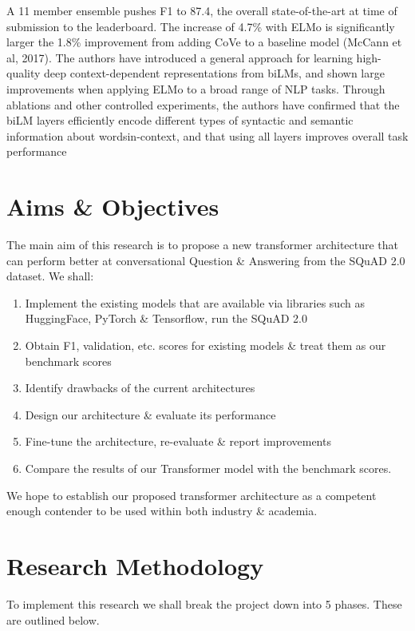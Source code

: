 \documentclass[11pt]{article}
\begin{document}
\begin{enumerate}
    A 11 member ensemble pushes F1 to 87.4, the overall state-of-the-art at time of submission to the leaderboard. The increase of 4.7\% with ELMo is significantly larger the 1.8\% improvement from adding CoVe to a baseline model (McCann et al, 2017).  The authors have introduced a general approach for learning high-quality deep context-dependent representations from biLMs, and shown large improvements when applying ELMo to a broad range of NLP tasks.
    Through ablations and other controlled experiments, the authors have confirmed that the biLM layers efficiently encode different types of syntactic and semantic information about wordsin-context, and that using all layers improves overall task performance
    \cite{contextualized}
\end{enumerate}

\newpage
\newpage
\section{Aims \& Objectives}\label{aims}

The main aim of this research is to propose a new transformer architecture that can perform better at conversational Question \& Answering from the SQuAD 2.0 dataset\cite{dataset}.
We shall:
\begin{enumerate}
    \item Implement the existing models that are available via libraries such as HuggingFace\cite{hfTransformers}, PyTorch \& Tensorflow, run the SQuAD 2.0\cite{dataset}
    \item Obtain F1, validation, etc. scores for existing models \& treat them as our benchmark scores
    \item Identify drawbacks of the current architectures
    \item Design our architecture \& evaluate its performance
    \item Fine-tune the architecture, re-evaluate \& report improvements
    \item Compare the results of our Transformer model with the benchmark scores.
\end{enumerate}
We hope to establish our proposed transformer architecture as a competent enough contender to be used within both industry \& academia.
\section{Research Methodology}\label{researchMeth}

To implement this research we shall break the project down into 5 phases. These are outlined below.
\end{document}
